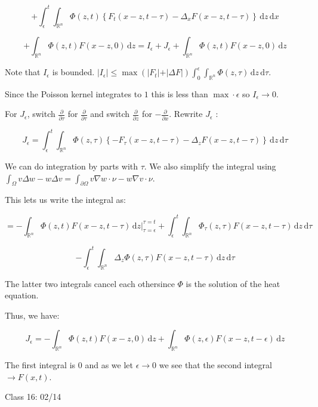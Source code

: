\documentclass{article}
\theoremstyle{definition}
\begin{document}
\[
    +\int_{\epsilon}^{t} \int_{\mathbb{R}^n}^{} \Phi(z,t) \left\{ F_t(x-z,t-\tau) - \Delta_x F(x-z,t-\tau) \right\}  \,\mathrm{d}z \,\mathrm{d}x 
\]

\[
    +\int_{\mathbb{R}^n}^{} \Phi(z,t)F(x-z,0) \,\mathrm{d}z = I_{\epsilon } + J_{\epsilon} + \int_{\mathbb{R}^n}^{} \Phi(z,t)F(x-z,0) \,\mathrm{d}z 
\]

Note that \(I_{\epsilon} \) is bounded. \(\vert I_{\epsilon}  \vert \leq \max (\vert F_t \vert + \vert \Delta F \vert )\int_{0}^{\epsilon} \int_{\mathbb{R}^n}^{} \Phi(z,\tau) \,\mathrm{d}z  \,\mathrm{d}\tau\).

Since the Poisson kernel integrates to \(1\) this is less than \(\max\cdot \epsilon\) so \(I_{\epsilon} \to 0\).

For \(J_{\epsilon}\), switch \(\frac{\partial}{\partial \tau} \) for \(\frac{\partial}{\partial \tau} \) and switch \(\frac{\partial }{\partial z} \) for \(-\frac{\partial}{\partial x} \). Rewrite \(J_{\epsilon} \) :

\[
    J_{\epsilon} = \int_{\epsilon}^{t} \int_{\mathbb{R}^n}^{} \Phi(z,\tau) \left\{ - F_\tau(x-z,t-\tau)-\Delta_z F(x-z,t-\tau) \right\}  \,\mathrm{d}z  \,\mathrm{d}\tau 
\]

We can do integration by parts with \(\tau\). We also simplify the integral using \(\int_\Omega v\Delta w - w\Delta v = \int_{\partial \Omega} v\nabla w\cdot\nu - w\nabla v\cdot\nu\).

This lets us write the integral as:

\[
    = - \int_{\mathbb{R}^n}^{} \Phi(z,t)F(x-z,t-\tau) \,\mathrm{d}z \bigg|_{\tau = \epsilon}^{\tau = t} + \int_{\epsilon}^{t} \int_{\mathbb{R}^n}^{} \Phi_\tau (z,\tau) F(x-z,t-\tau) \,\mathrm{d}z  \,\mathrm{d}\tau 
\]

\[
    - \int_{\epsilon}^{t} \int_{\mathbb{R}^n}^{} \Delta_z \Phi(z,\tau)F(x-z,t-\tau) \,\mathrm{d}z  \,\mathrm{d}\tau 
\]

The latter two integrals cancel each othersince \(\Phi\) is the solution of the heat equation.

Thus, we have:

\[
    J_{\epsilon} = - \int_{\mathbb{R}^n}^{} \Phi(z,t)F(x-z,0) \,\mathrm{d}z + \int_{\mathbb{R}^n}^{} \Phi(z,\epsilon) F(x-z,t-\epsilon) \,\mathrm{d}z 
\]

The first integral is \(0\) and as we let \(\epsilon \to 0\) we see that the second integral \(\to F(x,t)\).

\hrulefill

Class 16: 02/14
\end{document}
